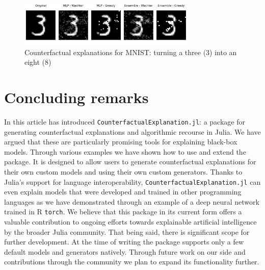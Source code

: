 \documentclass{juliacon}
\begin{document}
\begin{figure}

{\centering \includegraphics[width=3.33333in,height=0.83333in]{www/mnist_3_to_8.png}

}

\caption{\label{fig-mnist-3to8}Counterfactual explanations for MNIST:
turning a three (3) into an eight (8)}

\end{figure}

\hypertarget{sec-conclude}{%
\section{Concluding remarks}\label{sec-conclude}}

In this article has introduced \texttt{CounterfactualExplanation.jl}: a
package for generating counterfactual explanations and algorithmic
recourse in Julia. We have argued that these are particularly promising
tools for explaining black-box models. Through various examples we have
shown how to use and extend the package. It is designed to allow users
to generate counterfactual explanations for their own custom models and
using their own custom generators. Thanks to Julia's support for
language interoperability, \texttt{CounterfactualExplanation.jl} can
even explain models that were developed and trained in other programming
languages as we have demonstrated through an example of a deep neural
network trained in R \texttt{torch}. We believe that this package in its
current form offers a valuable contribution to ongoing efforts towards
explainable artificial intelligence by the broader Julia community. That
being said, there is significant scope for further development. At the
time of writing the package supports only a few default models and
generators natively. Through future work on our side and contributions
through the community we plan to expand its functionality further.


\end{document}
